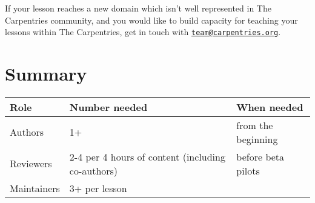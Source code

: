 \documentclass[
]{book}
\begin{document}
If your lesson reaches a new domain which isn't well represented in The Carpentries community,
and you would like to build capacity for teaching your lessons within The Carpentries, get in
touch with \href{mailto:team@carpentries.org}{\nolinkurl{team@carpentries.org}}.

\hypertarget{summary}{%
\section{Summary}\label{summary}}

\begin{longtable}[]{@{}lll@{}}
\toprule
\begin{minipage}[b]{0.18\columnwidth}\raggedright
Role\strut
\end{minipage} & \begin{minipage}[b]{0.40\columnwidth}\raggedright
Number needed\strut
\end{minipage} & \begin{minipage}[b]{0.33\columnwidth}\raggedright
When needed\strut
\end{minipage}\tabularnewline
\midrule
\endhead
\begin{minipage}[t]{0.18\columnwidth}\raggedright
Authors\strut
\end{minipage} & \begin{minipage}[t]{0.40\columnwidth}\raggedright
1+\strut
\end{minipage} & \begin{minipage}[t]{0.33\columnwidth}\raggedright
from the beginning\strut
\end{minipage}\tabularnewline
\begin{minipage}[t]{0.18\columnwidth}\raggedright
Reviewers\strut
\end{minipage} & \begin{minipage}[t]{0.40\columnwidth}\raggedright
2-4 per 4 hours of content (including co-authors)\strut
\end{minipage} & \begin{minipage}[t]{0.33\columnwidth}\raggedright
before beta pilots\strut
\end{minipage}\tabularnewline
\begin{minipage}[t]{0.18\columnwidth}\raggedright
Maintainers\strut
\end{minipage} & \begin{minipage}[t]{0.40\columnwidth}\raggedright
3+ per lesson\strut
\end{minipage} & \begin{minipage}[t]{0.33\columnwidth}\raggedright

\end{minipage}
\end{longtable}
\end{document}
